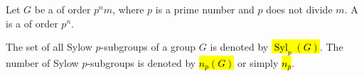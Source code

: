 \begin{definition} \label{definition:sylow_p_subgroup_of_a_finite_group}
Let $G$ be a   of order $p^n m$, where $p$ is a prime number and $p$ does not divide $m$.
A  is a  of order $p^n$.

The set of all Sylow $p$-subgroups of a group $G$ is denoted by \hl{$\operatorname{Syl}_p(G)$}. The number of Sylow $p$-subgroups is denoted by \hl{$n_p(G)$} or simply \hl{$n_p$}. 
\end{definition}